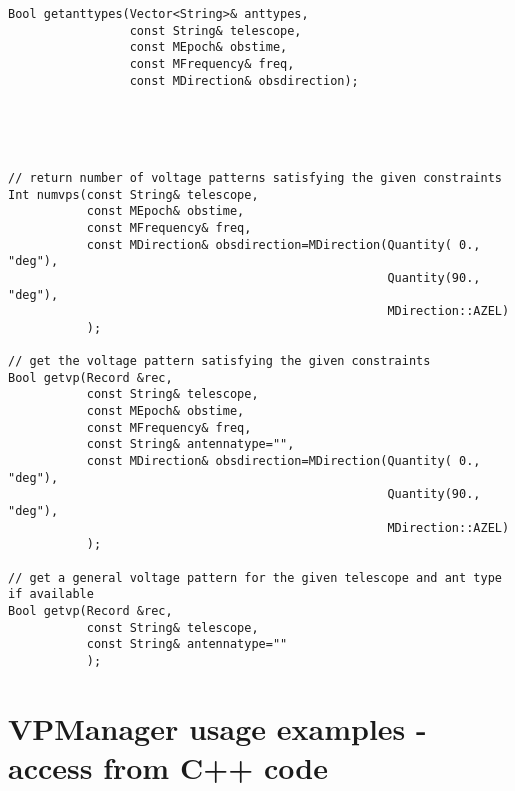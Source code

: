 \documentclass[12pt]{article}
\begin{document}
{\begin{verbatim}
Bool getanttypes(Vector<String>& anttypes,
                 const String& telescope,
                 const MEpoch& obstime,
                 const MFrequency& freq, 
                 const MDirection& obsdirection); 
                


        
\end{verbatim}


\begin{verbatim}
// return number of voltage patterns satisfying the given constraints
Int numvps(const String& telescope,
           const MEpoch& obstime,
           const MFrequency& freq, 
           const MDirection& obsdirection=MDirection(Quantity( 0., "deg"),
                                                     Quantity(90., "deg"), 
                                                     MDirection::AZEL)
           ); 

// get the voltage pattern satisfying the given constraints
Bool getvp(Record &rec,
           const String& telescope,
           const MEpoch& obstime,
           const MFrequency& freq, 
           const String& antennatype="", 
           const MDirection& obsdirection=MDirection(Quantity( 0., "deg"),
                                                     Quantity(90., "deg"), 
                                                     MDirection::AZEL)
           ); 

// get a general voltage pattern for the given telescope and ant type if available
Bool getvp(Record &rec,
           const String& telescope,
           const String& antennatype=""
           ); 

\end{verbatim}
}

\newpage

\section{VPManager usage examples - access from C++ code}
\label{appVPManex}
\end{document}
